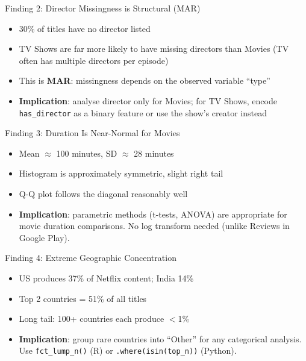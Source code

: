 \documentclass[10pt]{beamer}
\begin{document}
\begin{frame}{Finding 2: Director Missingness is Structural (MAR)}
  \begin{itemize}
    \item 30\% of titles have no director listed
    \item TV Shows are far more likely to have missing directors than
          Movies (TV often has multiple directors per episode)
    \item This is \textbf{MAR}: missingness depends on the observed
          variable ``type''
    \item \textbf{Implication}: analyse director only for Movies;
          for TV Shows, encode \texttt{has\_director} as a binary
          feature or use the show's creator instead
  \end{itemize}
\end{frame}

\begin{frame}{Finding 3: Duration Is Near-Normal for Movies}
  \begin{itemize}
    \item Mean $\approx$ 100 minutes, SD $\approx$ 28 minutes
    \item Histogram is approximately symmetric, slight right tail
    \item Q-Q plot follows the diagonal reasonably well
    \item \textbf{Implication}: parametric methods (t-tests, ANOVA) are
          appropriate for movie duration comparisons. No log transform
          needed (unlike Reviews in Google Play).
  \end{itemize}
\end{frame}

\begin{frame}{Finding 4: Extreme Geographic Concentration}
  \begin{itemize}
    \item US produces 37\% of Netflix content; India 14\%
    \item Top 2 countries = 51\% of all titles
    \item Long tail: 100+ countries each produce $<$1\%
    \item \textbf{Implication}: group rare countries into ``Other'' for
          any categorical analysis. Use \texttt{fct\_lump\_n()} (R) or
          \texttt{.where(isin(top\_n))} (Python).
  \end{itemize}
\end{frame}
\end{document}
